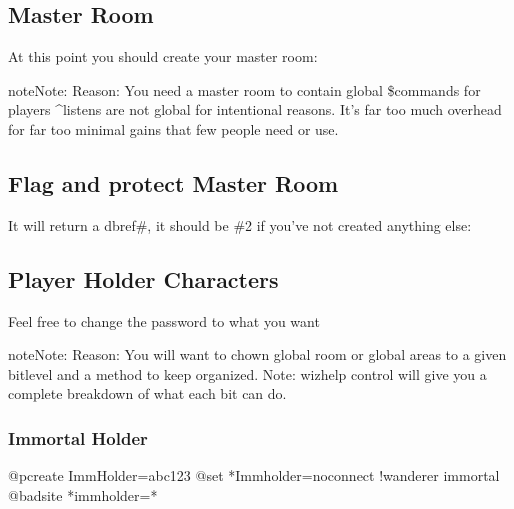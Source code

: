 \documentclass[letterpaper,10pt,english]{sphinxmanual}
\begin{document}
\subsection{Master Room}
\label{\detokenize{gettingstarted:master-room}}
\sphinxAtStartPar
At this point you should create your master room:

\begin{sphinxVerbatim}[commandchars=\\\{\}]
  
\end{sphinxVerbatim}

\begin{sphinxadmonition}{note}{Note:}
\sphinxAtStartPar
Reason: You need a master room to contain global \$commands for players
\textasciicircum{}listens are not global for intentional reasons.  It’s far too much overhead for far too minimal gains that few people need or use.
\end{sphinxadmonition}


\subsection{Flag and protect Master Room}
\label{\detokenize{gettingstarted:flag-and-protect-master-room}}
\sphinxAtStartPar
It will return a dbref\#, it should be \#2 if you’ve not created anything else:

\begin{sphinxVerbatim}[commandchars=\\\{\}]
 
\end{sphinxVerbatim}


\subsection{Player Holder Characters}
\label{\detokenize{gettingstarted:player-holder-characters}}
\sphinxAtStartPar
Feel free to change the password to what you want

\begin{sphinxadmonition}{note}{Note:}
\sphinxAtStartPar
Reason: You will want to chown global room or global areas to a given bitlevel and a method to keep organized.
Note: wizhelp control will give you a complete breakdown of what each bit can do.
\end{sphinxadmonition}


\subsubsection{Immortal Holder}
\label{\detokenize{gettingstarted:immortal-holder}}
\begin{sphinxVerbatim}[commandchars=\\\{\}]
@pcreate ImmHolder=abc123
@set *Immholder=no\PYGZus{}connect !wanderer immortal
@badsite *immholder=*
\end{sphinxVerbatim}
\end{document}
